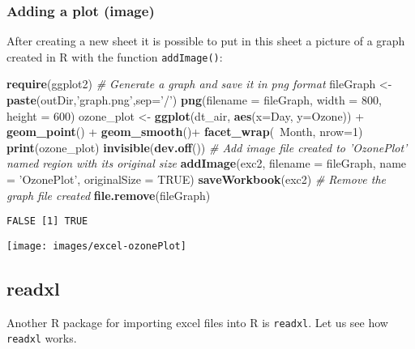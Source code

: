 \documentclass[]{book}
\newenvironment{Shaded}{\begin{snugshade}}{\end{snugshade}}
\newcommand{\KeywordTok}[1]{\textcolor[rgb]{0.13,0.29,0.53}{\textbf{{#1}}}}
\newcommand{\DataTypeTok}[1]{\textcolor[rgb]{0.13,0.29,0.53}{{#1}}}
\newcommand{\DecValTok}[1]{\textcolor[rgb]{0.00,0.00,0.81}{{#1}}}
\newcommand{\StringTok}[1]{\textcolor[rgb]{0.31,0.60,0.02}{{#1}}}
\newcommand{\CommentTok}[1]{\textcolor[rgb]{0.56,0.35,0.01}{\textit{{#1}}}}
\newcommand{\OtherTok}[1]{\textcolor[rgb]{0.56,0.35,0.01}{{#1}}}
\newcommand{\NormalTok}[1]{{#1}}
\begin{document}
\subsubsection{Adding a plot (image)}\label{adding-a-plot-image}

After creating a new sheet it is possible to put in this sheet a picture
of a graph created in R with the function \texttt{addImage()}:

\begin{Shaded}
\begin{Highlighting}[]
\KeywordTok{require}\NormalTok{(ggplot2)}
\CommentTok{# Generate a graph and save it in png format}
\NormalTok{fileGraph <-}\StringTok{ }\KeywordTok{paste}\NormalTok{(outDir,}\StringTok{'graph.png'}\NormalTok{,}\DataTypeTok{sep=}\StringTok{'/'}\NormalTok{)}
\KeywordTok{png}\NormalTok{(}\DataTypeTok{filename =} \NormalTok{fileGraph, }\DataTypeTok{width =} \DecValTok{800}\NormalTok{, }\DataTypeTok{height =} \DecValTok{600}\NormalTok{)}
\NormalTok{ozone_plot <-}\StringTok{ }\KeywordTok{ggplot}\NormalTok{(dt_air, }\KeywordTok{aes}\NormalTok{(}\DataTypeTok{x=}\NormalTok{Day, }\DataTypeTok{y=}\NormalTok{Ozone)) +}\StringTok{ }
\KeywordTok{geom_point}\NormalTok{() +}\StringTok{ }
\KeywordTok{geom_smooth}\NormalTok{()+}
\KeywordTok{facet_wrap}\NormalTok{(~Month, }\DataTypeTok{nrow=}\DecValTok{1}\NormalTok{)}
\KeywordTok{print}\NormalTok{(ozone_plot)}
\KeywordTok{invisible}\NormalTok{(}\KeywordTok{dev.off}\NormalTok{())}
\CommentTok{# Add image file created to 'OzonePlot' named region with its original size }
\KeywordTok{addImage}\NormalTok{(exc2, }\DataTypeTok{filename =}  \NormalTok{fileGraph, }\DataTypeTok{name =} \StringTok{'OzonePlot'}\NormalTok{, }\DataTypeTok{originalSize =} \OtherTok{TRUE}\NormalTok{)}
\KeywordTok{saveWorkbook}\NormalTok{(exc2)}
\CommentTok{# Remove the graph file created }
\KeywordTok{file.remove}\NormalTok{(fileGraph)}
\end{Highlighting}
\end{Shaded}

\begin{verbatim}
FALSE [1] TRUE
\end{verbatim}

\texttt{[image: images/excel-ozonePlot]}

\subsection{readxl}\label{readxl}

Another R package for importing excel files into R is \texttt{readxl}.
Let us see how \texttt{readxl} works.
\end{document}
